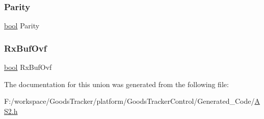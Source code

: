 \mbox{\label{union_a_s2___t_error_a99fd786f4086e50e917c12b226fc82af}} 
\subsubsection{\texorpdfstring{Parity}{Parity}}
{\footnotesize\ttfamily \hyperlink{group___p_e___types__module_ga97a80ca1602ebf2303258971a2c938e2}{bool} Parity}

\mbox{\label{union_a_s2___t_error_aed37d6601dc7121b167ee47354444421}} 
\subsubsection{\texorpdfstring{Rx\+Buf\+Ovf}{RxBufOvf}}
{\footnotesize\ttfamily \hyperlink{group___p_e___types__module_ga97a80ca1602ebf2303258971a2c938e2}{bool} Rx\+Buf\+Ovf}



The documentation for this union was generated from the following file\+:\begin{DoxyCompactItemize}
\item 
F\+:/workspace/\+Goods\+Tracker/platform/\+Goods\+Tracker\+Control/\+Generated\+\_\+\+Code/\hyperlink{_a_s2_8h}{A\+S2.\+h}\end{DoxyCompactItemize}
